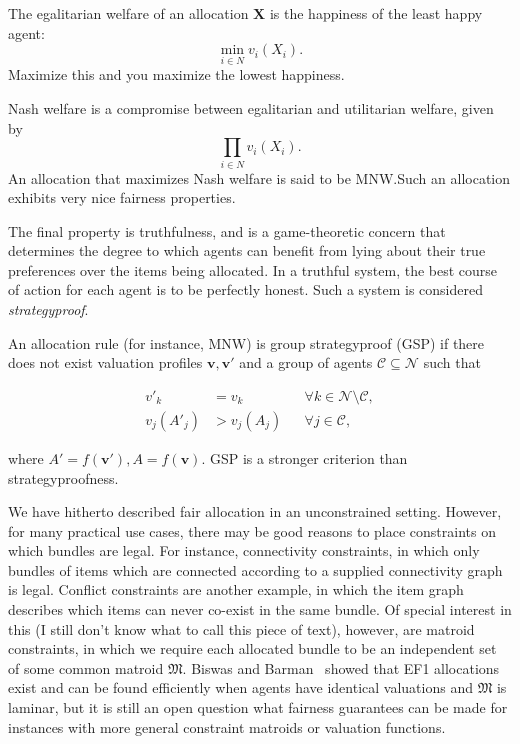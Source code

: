 The egalitarian welfare of an allocation $\textbf{X}$ is the happiness of the least happy agent: \[\min_{i \in N} v_i(X_i).\] Maximize this and you maximize the lowest happiness.

Nash welfare is a compromise between egalitarian and utilitarian welfare, given by \[\prod_{i \in N} v_i(X_i).\] An allocation that maximizes Nash welfare is said to be MNW.\@ Such an allocation exhibits very nice fairness properties.

The final property is truthfulness, and is a game-theoretic concern that determines the degree to which agents can benefit from lying about their true preferences over the items being allocated. In a truthful system, the best course of action for each agent is to be perfectly honest. Such a system is considered \textit{strategyproof}.

An allocation rule (for instance, MNW) is group strategyproof (GSP) if there does not exist valuation profiles $\mathbf{v}, \mathbf{v}'$ and a  group of agents $\mathcal{C} \subseteq \mathcal{N}$ such that

\[\begin{aligned}
    v'_k      & = v_k      &  & \forall k \in \mathcal{N} \setminus \mathcal{C}, \\
    v_j(A'_j) & > v_j(A_j) &  & \forall j \in \mathcal{C},
  \end{aligned}\]

where $A' = f(\mathbf{v}'), A = f(\mathbf{v})$. GSP is a stronger criterion than strategyproofness.

We have hitherto described fair allocation in an unconstrained setting. However, for many practical use cases, there may be good reasons to place constraints on which bundles are legal. For instance, connectivity constraints, in which only bundles of items which are connected according to a supplied connectivity graph is legal. Conflict constraints are another example, in which the item graph describes which items can never co-exist in the same bundle. Of special interest in this (I still don't know what to call this piece of text), however, are matroid constraints, in which we require each allocated bundle to be an independent set of some common matroid $\mathfrak{M}$. Biswas and Barman~\cite{biswas-barman-2018} showed that EF1 allocations exist and can be found efficiently when agents have identical valuations and $\mathfrak{M}$ is laminar, but it is still an open question what fairness guarantees can be made for instances with more general constraint matroids or valuation functions.



